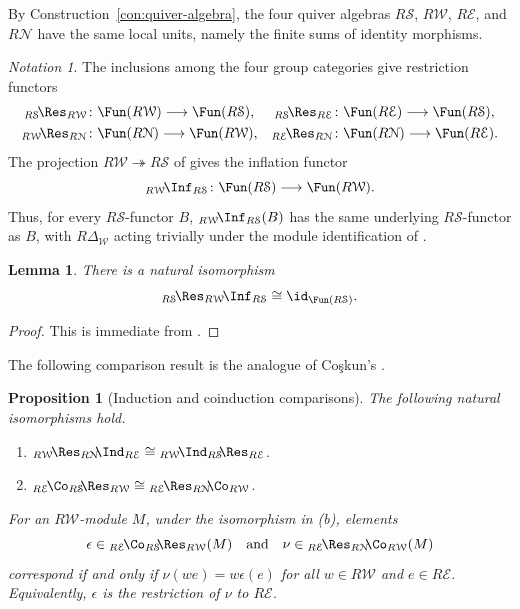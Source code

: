 \documentclass{amsart}
\numberwithin{equation}{section}%
\newtheorem{Prop}[equation]{Proposition}
\newtheorem{Lem}[equation]{Lemma}
\theoremstyle{remark}
\newtheorem{Not}[equation]{Notation}
\theoremstyle{definition}
\newcommand{\e}{\mathcal E}
\newcommand{\s}{\mathcal S}
\newcommand{\n}{\mathcal N}
\newcommand{\w}{\mathcal W}
\newcommand{\iInd}[2]{{}_{#1}\!\Ind_{#2}}
\newcommand{\iRes}[2]{{}_{#1}\!\Res_{#2}}
\newcommand{\iInf}[2]{{}_{#1}\!\Inf_{#2}}
\newcommand{\iCo}[2]{{}_{#1}\!\Co_{#2}}
\begin{document}
By Construction~\ref{con:quiver-algebra}, the four quiver algebras
$R\mathcal S$, $R\mathcal W$, $R\mathcal E$, and $R\mathcal N$
have the same local units, namely the finite sums of identity
morphisms.
%
\begin{Not}
\label{not:W-restriction-inflation}
The inclusions among the four group categories give restriction
functors
%
\[
\begin{aligned}
\iRes{R\s}{R\w}
&\colon
\Fun(R\w)\longrightarrow\Fun(R\s),
&
\iRes{R\s}{R\e}
&\colon
\Fun(R\e)\longrightarrow\Fun(R\s),
\\
\iRes{R\w}{R\n}
&\colon
\Fun(R\n)\longrightarrow\Fun(R\w),
&
\iRes{R\e}{R\n}
&\colon
\Fun(R\n)\longrightarrow\Fun(R\e).
\end{aligned}
\]
%
The projection
$R\mathcal W\twoheadrightarrow R\mathcal S$
of  gives the inflation functor
%
\[
\iInf{R\w}{R\s}
\colon
\Fun(R\s)\longrightarrow\Fun(R\w).
\]
%
Thus, for every $R\s$-functor $B$,
$\iInf{R\w}{R\s}(B)$ has the same underlying
$R\s$-functor as $B$, with $R\Delta_{\mathcal W}$ acting trivially
under the module identification of .
\end{Not}
%
\begin{Lem}
\label{lem:Res-Inf-identity}
There is a natural isomorphism
%
\[
{}\iRes{R\mathcal S}{R\mathcal W}\!\Inf_{R\mathcal S}
\cong
\id_{\Fun(R\s)}.
\]
\end{Lem}
%
\begin{proof}
This is immediate from .
\end{proof}
%
The following comparison result is the analogue of
Co\c{s}kun's \cite[Thm.~3.4]{Coskun07}.
%
\begin{Prop}[Induction and coinduction comparisons]
\label{prop:Ind-Coind-comparison}
The following natural isomorphisms hold.
\begin{enumerate}[\rm(a)]
\item
$\iRes{R\w}{R\n}\!\iInd{}{R\e}
\cong
\iInd{R\w}{R\s}\!\iRes{}{R\e}$.
%
\item $\iCo{R\e}{R\s}\!
\iRes{}{R\w}
\cong
{}\iRes{R\e}{R\n}\!
\iCo{}{R\w}$.
\end{enumerate}

For an $R\mathcal W$-module $M$, under the isomorphism in
\textup{(b)}, elements
%
\[
\epsilon\in
{}\iCo{R\mathcal E}{R\mathcal S}\!
\iRes{}{R\mathcal W}(M)
\quad\text{and}\quad
\nu\in
{}\iRes{R\mathcal E}{R\mathcal N}\!
\iCo{}{R\mathcal W}(M)
\]
%
correspond if and only if
$\nu(we)=w\epsilon(e)$
for all $w\in R\mathcal W$ and $e\in R\mathcal E$.
Equivalently, $\epsilon$ is the restriction of $\nu$ to
$R\mathcal E$.
\end{Prop}
\end{document}
